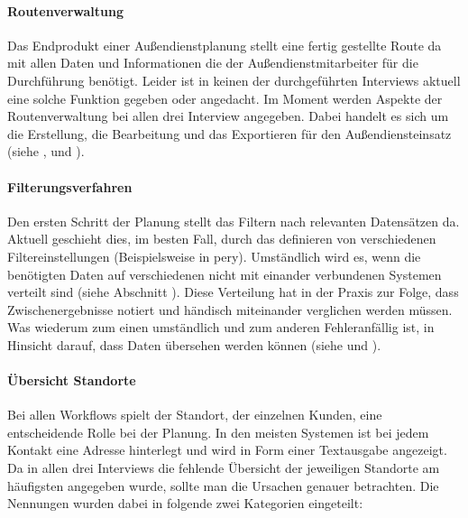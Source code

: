 \documentclass[Bachelorarbeit.tex]{subfiles}
\begin{document}
\paragraph{Routenverwaltung}
\label{interviewsAnalyseRoutenverwaltung}
Das Endprodukt einer Außendienstplanung stellt eine fertig gestellte Route da mit allen Daten und Informationen die der Außendienstmitarbeiter für die Durchführung benötigt.
Leider ist in keinen der durchgeführten Interviews aktuell eine solche Funktion gegeben oder angedacht.
Im Moment werden Aspekte der Routenverwaltung bei allen drei Interview angegeben.
Dabei handelt es sich um die Erstellung, die Bearbeitung und das Exportieren für den Außendiensteinsatz (siehe ,  und ). 

\paragraph{Filterungsverfahren}
\label{interviewsAnalyseFilterungsverfahren}
Den ersten Schritt der Planung stellt das Filtern nach relevanten Datensätzen da.
Aktuell geschieht dies, im besten Fall, durch das definieren von verschiedenen Filtereinstellungen (Beispielsweise in pery).
Umständlich wird es, wenn die benötigten Daten auf verschiedenen nicht mit einander verbundenen Systemen verteilt sind (siehe Abschnitt ). 
Diese Verteilung hat in der Praxis zur Folge, dass Zwischenergebnisse notiert und händisch miteinander verglichen werden müssen.
Was wiederum zum einen umständlich und zum anderen Fehleranfällig ist, in Hinsicht darauf, dass Daten übersehen werden können (siehe  und ).


\paragraph*{Übersicht Standorte}
\label{interviewsAnalyseStandorte}
Bei allen Workflows spielt der Standort, der einzelnen Kunden, eine entscheidende Rolle bei der Planung.
In den meisten Systemen ist bei jedem Kontakt eine Adresse hinterlegt und wird in Form einer Textausgabe angezeigt.
Da in allen drei Interviews die fehlende Übersicht der jeweiligen Standorte am häufigsten angegeben wurde, sollte man die Ursachen genauer betrachten. 
Die Nennungen wurden dabei in folgende zwei Kategorien eingeteilt:
\end{document}
